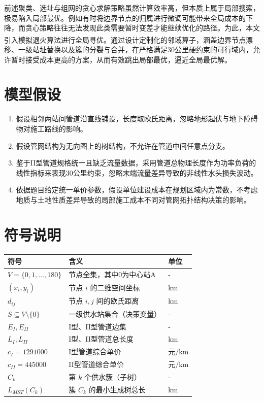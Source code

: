 \documentclass[12pt,a4paper]{ctexart}
\theoremstyle{definition}
\theoremstyle{plain}
\theoremstyle{remark}
\newcommand{\supercite}[1]{\textsuperscript{\cite{#1}}}
\newenvironment{symboltable}
  {\begin{center}\zihao{5}\begin{tabular}{>{\centering\arraybackslash}p{3.5cm} p{7.5cm} >{\centering\arraybackslash}p{1.5cm}}
  \toprule
  \textbf{符号} & \textbf{含义} & \textbf{单位} \\
  \midrule}
  {\bottomrule\end{tabular}\end{center}}
\begin{document}
前述聚类、选址与组网的贪心求解策略虽然计算效率高，但本质上属于局部搜索，极易陷入局部最优。例如有时将边界节点的归属进行微调可能带来全局成本的下降，而贪心策略往往无法发现此类需要暂时变差才能继续优化的路径。为此，本文引入模拟退火算法\supercite{ref3}进行全局寻优。通过设计定制化的邻域算子，涵盖边界节点漂移、一级站址替换以及簇的分裂与合并，在严格满足30公里硬约束的可行域内，允许暂时接受成本更高的方案，从而有效跳出局部最优，逼近全局最优解。
\section{模型假设}
\begin{enumerate}[label=\arabic*.]
  \item 假设相邻两站间管道沿直线铺设，长度取欧氏距离，忽略地形起伏与地下障碍物对施工路线的影响。
  \item 假设管网结构为无向图上的树结构，不允许在管道中间任意点分支。
  \item 鉴于II型管道规格统一且缺乏流量数据，采用管道总物理长度作为功率负荷的线性指标来表现30公里约束，忽略末端流量差异导致的非线性水头损失波动。
  \item 依据题目给定统一单价参数，假设单位建设成本在规划区域内为常数，不考虑地质与土地性质差异导致的局部施工成本不同对管网拓扑结构决策的影响。
\end{enumerate}

\section{符号说明}
\begin{symboltable}
$V = \{0, 1, \ldots, 180\}$  & 节点全集，其中0为中心站A & -  \\
$(x_i, y_i)$  & 节点 $i$ 的二维空间坐标 & km  \\
$d_{ij}$  & 节点 $i, j$ 间的欧氏距离 & km  \\
$S \subseteq V \setminus \{0\}$  & 一级供水站集合（决策变量） & -  \\
$E_I, E_{II}$  & I型、II型管道边集 & -  \\
$L_I, L_{II}$  & I型、II型管道总长度 & km  \\
$c_I = 1291000$  & I型管道综合单价 & 元/km  \\
$c_{II} = 445000$  & II型管道综合单价 & 元/km  \\
$C_k$  & 第 $k$ 个供水簇（子树） & -  \\
$L_{MST}(C_k)$  & 簇 $C_k$ 的最小生成树总长 & km  \\
\end{symboltable}
\end{document}
